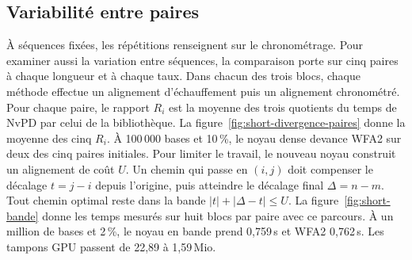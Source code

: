 \subsection{Variabilité entre paires}
À séquences fixées, les répétitions renseignent sur le chronométrage. Pour examiner aussi la variation entre séquences, la comparaison porte sur cinq paires à chaque longueur et à chaque taux. Dans chacun des trois blocs, chaque méthode effectue un alignement d’échauffement puis un alignement chronométré. Pour chaque paire, le rapport \(R_i\) est la moyenne des trois quotients du temps de NvPD par celui de la bibliothèque. La figure~\ref{fig:short-divergence-paires} donne la moyenne des cinq \(R_i\).
À 100\,000 bases et 10\,\%, le noyau dense devance WFA2 sur deux des cinq paires initiales. Pour limiter le travail, le nouveau noyau construit un alignement de coût \(U\). Un chemin qui passe en \((i,j)\) doit compenser le décalage \(t=j-i\) depuis l’origine, puis atteindre le décalage final \(\Delta=n-m\). Tout chemin optimal reste dans la bande \(|t|+|\Delta-t|\le U\). La figure~\ref{fig:short-bande} donne les temps mesurés sur huit blocs par paire avec ce parcours.
À un million de bases et 2\,\%, le noyau en bande prend 0,759\,s et WFA2 0,762\,s. Les tampons GPU passent de 22,89 à 1,59\,Mio.


